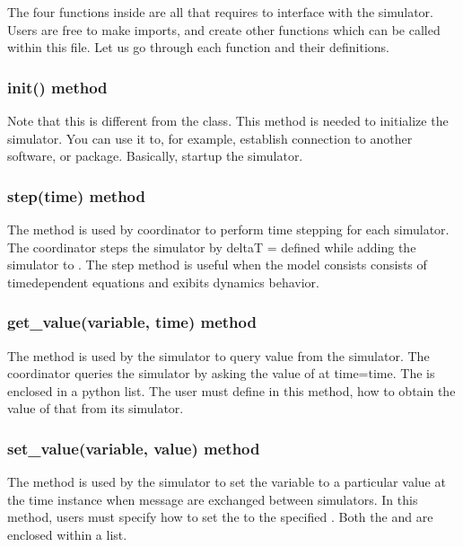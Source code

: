 \documentclass[letterpaper,10pt,english]{sphinxmanual}
\begin{document}
The four functions inside  are all that  requires to interface with the simulator. Users are free to make imports, and create other functions which can be called within this file. Let us go through each function and their definitions.


\subsubsection{init() method}
\label{\detokenize{working_external_sims:init-method}}
Note that this is different from the  class. This method is needed to initialize the simulator. You can use it to, for example, establish connection to another software, or package. Basically, start\sphinxhyphen{}up the simulator.


\subsubsection{step(time) method}
\label{\detokenize{working_external_sims:step-time-method}}
The  method is used by  coordinator to perform time stepping for each simulator. The coordinator steps the simulator by deltaT =  defined while adding the simulator to . The step method is useful when the model consists consists of time\sphinxhyphen{}dependent equations and exibits dynamics behavior.


\subsubsection{get\_value(variable, time) method}
\label{\detokenize{working_external_sims:get-value-variable-time-method}}
The  method is used by the simulator to query  value from the simulator. The coordinator queries the simulator by asking the value of  at time=\textasciigrave{}\textasciigrave{}time\textasciigrave{}\textasciigrave{}. The  is enclosed in a python list. The user must define in this method, how to obtain the value of that  from its simulator.


\subsubsection{set\_value(variable, value) method}
\label{\detokenize{working_external_sims:set-value-variable-value-method}}
The  method is used by the simulator to set the variable to a particular value at the time instance when message are exchanged between simulators. In this method, users must specify how to set the  to the specified . Both the  and  are enclosed within a list.
\end{document}
